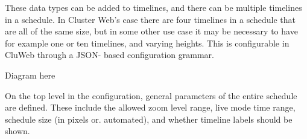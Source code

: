 These data types can be added to timelines, and there can be multiple timelines in a schedule. In Cluster Web's case there are four timelines in a schedule that are all of the same size, but in some other use case it may be necessary to have for example one or ten timelines, and varying heights. This is configurable in CluWeb through a JSON- based configuration grammar.

Diagram here

On the top level in the configuration, general parameters of the entire schedule are defined. These include the allowed zoom level range, live mode time range, schedule size (in pixels or. automated), and whether timeline labels should be shown.